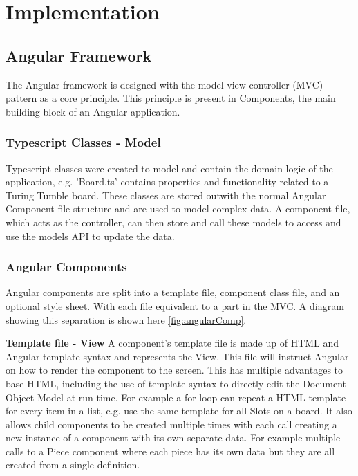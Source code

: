 \documentclass{l4proj}
\begin{document}
\chapter{Implementation}
\label{section:implementation}
\section{Angular Framework}
The Angular framework is designed with the model view controller (MVC) pattern as a core principle.  This principle is present in Components, the main building block of an Angular application. 

\subsection{Typescript Classes - Model}
Typescript classes were created to model and contain the domain logic of the application, e.g. 'Board.ts' contains properties and functionality related to a Turing Tumble board. These classes are stored outwith the normal Angular Component file structure and are used to model complex data. A component file, which acts as the controller, can then store and call these models to access and use the models API to update the data.

\subsection{Angular Components}
Angular components are split into a template file, component class file, and an optional style sheet. With each file equivalent to a part in the MVC. A diagram showing this separation is shown here \ref{fig:angularComp}. 

\textbf{Template file - View}
A component's template file is made up of HTML and Angular template syntax and represents the View. This file will instruct Angular on how to render the component to the screen. This has multiple advantages to base HTML, including the use of template syntax to directly edit the Document Object Model at run time. For example a for loop can repeat a HTML template for every item in a list, e.g. use the same template for all Slots on a board. It also allows child components to be created multiple times with each call creating a new instance of a component with its own separate data. For example multiple calls to a Piece component where each piece has its own data but they are all created from a single definition.
\end{document}
